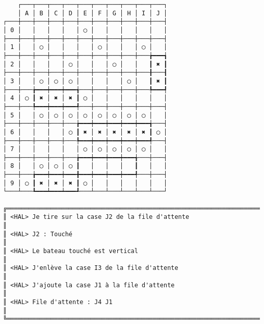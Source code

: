 {\scriptsize
\begin{verbatim}
    ┌───┬───┬───┬───┬───┬───┬───┬───┬───┬───┐
    │ A │ B │ C │ D │ E │ F │ G │ H │ I │ J │
┌───┼───┼───┼───┼───┼───┼───┼───┼───┼───┼───┤
│ 0 │   │   │   │   │ ◯ │   │   │   │   │   │
├───┼───┼───┼───┼───┼───┼───┼───┼───┼───┼───┤
│ 1 │   │ ◯ │   │   │   │ ◯ │   │   │ ◯ │   │
├───┼───┼───┼───┼───┼───┼───┼───┼───┼───╆━━━┪
│ 2 │   │   │   │ ◯ │   │   │ ◯ │   │   ┃ ✖ ┃
├───┼───┼───┼───┼───┼───┼───┼───┼───┼───╂───┨
│ 3 │   │ ◯ │ ◯ │ ◯ │   │   │   │ ◯ │   ┃ ✖ ┃
├───┼───╆━━━┿━━━┿━━━╅───┼───┼───┼───┼───╄━━━┩
│ 4 │ ◯ ┃ ✖ │ ✖ │ ✖ ┃ ◯ │   │   │   │   │   │
├───┼───╄━━━┿━━━┿━━━╃───┼───┼───┼───┼───┼───┤
│ 5 │   │ ◯ │ ◯ │ ◯ │ ◯ │ ◯ │ ◯ │ ◯ │ ◯ │   │
├───┼───┼───┼───┼───╆━━━┿━━━┿━━━┿━━━┿━━━╅───┤
│ 6 │   │   │   │ ◯ ┃ ✖ │ ✖ │ ✖ │ ✖ │ ✖ ┃ ◯ │
├───┼───┼───┼───┼───╄━━━┿━━━┿━━━┿━━━┿━━━╃───┤
│ 7 │   │   │   │   │ ◯ │ ◯ │ ◯ │ ◯ │ ◯ │   │
├───┼───┼───┼───┼───╆━━━┿━━━┿━━━┿━━━╅───┼───┤
│ 8 │   │ ◯ │ ◯ │ ◯ ┃   │   │   │   ┃   │   │
├───┼───╆━━━┿━━━┿━━━╋━━━┿━━━┿━━━┿━━━╃───┼───┤
│ 9 │ ◯ ┃ ✖ │ ✖ │ ✖ ┃ ◯ │   │   │   │   │   │
└───┴───┺━━━┷━━━┷━━━┹───┴───┴───┴───┴───┴───┘

╔══════════════════════════════════════════════════════════════════════════════════════════════════╗
║ <HAL> Je tire sur la case J2 de la file d'attente                                                ║
║ <HAL> J2 : Touché                                                                                ║
║ <HAL> Le bateau touché est vertical                                                              ║
║ <HAL> J'enlève la case I3 de la file d'attente                                                   ║
║ <HAL> J'ajoute la case J1 à la file d'attente                                                    ║
║ <HAL> File d'attente : J4 J1                                                                     ║
╚══════════════════════════════════════════════════════════════════════════════════════════════════╝
\end{verbatim}}
\newpage


